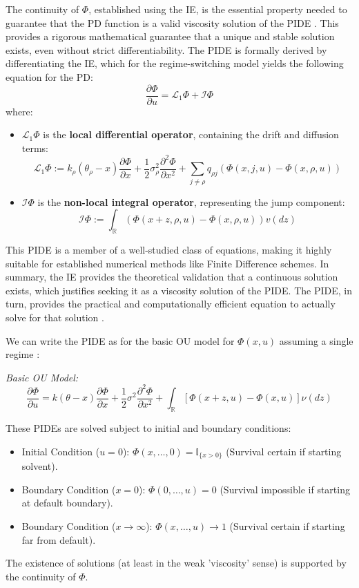 \documentclass[11pt,twoside,openright]{report}
\begin{document}
The continuity of $\Phi$, established using the IE, is the essential property needed to guarantee that the PD function is a valid viscosity solution of the PIDE \cite{barles2008second}. This provides a rigorous mathematical guarantee that a unique and stable solution exists, even without strict differentiability. The PIDE is formally derived by differentiating the IE, which for the regime-switching model yields the following equation for the PD:
\begin{equation}
\frac{\partial\Phi}{\partial u} = \mathcal{L}_{1}\Phi + \mathcal{I}\Phi
\label{eq:pide_regime_switching_PD}
\end{equation}
where:
\begin{itemize}
    \item $\mathcal{L}_{1}\Phi$ is the \textbf{local differential operator}, containing the drift and diffusion terms:
    $$
    \mathcal{L}_{1}\Phi := k_{\rho}(\theta_{\rho}-x)\frac{\partial\Phi}{\partial x} + \frac{1}{2}\sigma_{\rho}^{2}\frac{\partial^{2}\Phi}{\partial x^{2}} + \sum_{j\ne\rho}q_{\rho j}(\Phi(x,j,u)-\Phi(x,\rho,u))
    $$
    \item $\mathcal{I}\Phi$ is the \textbf{non-local integral operator}, representing the jump component:
    $$
    \mathcal{I}\Phi := \int_{\mathbb{R}}(\Phi(x+z,\rho,u)-\Phi(x,\rho,u))v(dz)
    $$
\end{itemize}
This PIDE is a member of a well-studied class of equations, making it highly suitable for established numerical methods like Finite Difference schemes. In summary, the IE provides the theoretical validation that a continuous solution exists, which justifies seeking it as a viscosity solution of the PIDE. The PIDE, in turn, provides the practical and computationally efficient equation to actually solve for that solution \cite{cont2005finite}.


We can write the PIDE as for the basic OU model for $\Phi(x, u)$ assuming a single regime \cite{georgiou2023thesis}:

\textit{Basic OU Model:}
\begin{equation}
\frac{\partial \Phi}{\partial u} = k(\theta - x)\frac{\partial \Phi}{\partial x} + \frac{1}{2}\sigma^2 \frac{\partial^2 \Phi}{\partial x^2} + \int_{\mathbb{R}} [\Phi(x+z, u) - \Phi(x, u)] \nu(dz)
\label{eq:pide_basic_ou}
\end{equation}


These PIDEs are solved subject to initial and boundary conditions:
\begin{itemize}
    \item Initial Condition ($u=0$): $\Phi(x, \dots, 0) = \mathbb{I}_{\{x>0\}}$ (Survival certain if starting solvent).
    \item Boundary Condition ($x=0$): $\Phi(0, \dots, u) = 0$ (Survival impossible if starting at default boundary).
    \item Boundary Condition ($x \to \infty$): $\Phi(x, \dots, u) \to 1$ (Survival certain if starting far from default).
\end{itemize}
The existence of solutions (at least in the weak 'viscosity' sense) is supported by the continuity of $\Phi$.
\end{document}

